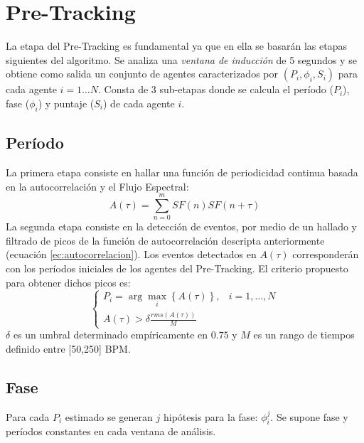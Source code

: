 \documentclass[12pt,a4paper,titlepage]{report}
\begin{document}

\section{Pre-Tracking}

La etapa del Pre-Tracking es fundamental ya que en ella se basarán las etapas siguientes del algoritmo. Se analiza una \emph{ventana de inducción} de 5 segundos y se obtiene como salida un conjunto de agentes caracterizados por $(P_i,\phi _i, S_i) $ para cada agente $i=1\dots N$. Consta de 3 sub-etapas donde se calcula el período ($P_i$), fase ($\phi _i$) y puntaje ($S_i$) de cada agente $i$.

\subsection{Período}
La primera etapa consiste en hallar una función de periodicidad continua basada en la autocorrelación y el Flujo Espectral:
\begin{equation}
	A(\tau) = \sum\limits_{n=0}^{m}SF(n)SF(n+\tau)
	\label{ec:autocorrelacion}
\end{equation}
La segunda etapa consiste en la detección de eventos, por medio de un hallado y filtrado de picos de la función de autocorrelación descripta anteriormente (ecuación \ref{ec:autocorrelacion}). Los eventos detectados en $A(\tau)$ corresponderán con los períodos iniciales de los agentes del Pre-Tracking. El criterio propuesto para obtener dichos picos es:
\begin{equation*}
	\begin{cases}
	P_i = \arg\max_i \left\{ A(\tau) \right\}, & i=1,\dots, N\\
	A(\tau)>\delta \frac{rms(A(\tau))}{M} & 
	\end{cases}
	\label{ec:period}
\end{equation*}
$\delta$ es un umbral determinado empíricamente en $0.75$ y $M$ es un rango de tiempos definido entre [50,250] BPM.


\subsection{Fase}

Para cada $P_i$ estimado se generan $j$ hipótesis para la fase: $\phi_i^j$. Se supone fase y períodos constantes en cada ventana de análisis.\\
\end{document}
